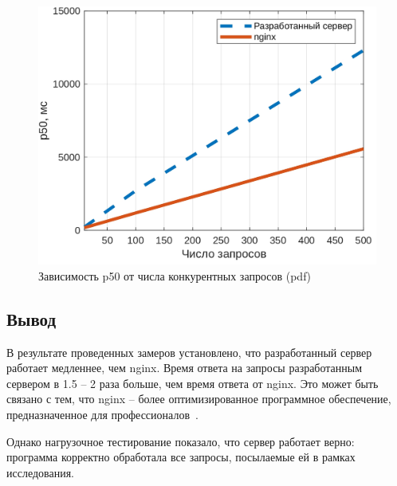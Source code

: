 \captionsetup{singlelinecheck = false, justification=centering}
\begin{figure}[H]
	\centering
	\includegraphics[scale=0.9]{img/pdf-c.jpg}
	\caption{Зависимость p50 от числа конкурентных запросов (pdf)}
	\label{pdf-comparison-c}
\end{figure}

\subsection*{Вывод}

В результате проведенных замеров установлено, что разработанный сервер работает медленнее, чем nginx. Время ответа на запросы разработанным сервером в 1.5 -- 2 раза больше, чем время ответа от nginx. Это может быть связано с тем, что nginx -- более оптимизированное программное обеспечение, предназначенное для профессионалов~\cite{nginx-tuning}.

Однако нагрузочное тестирование показало, что сервер работает верно: программа корректно обработала все запросы, посылаемые ей в рамках исследования.

\pagebreak